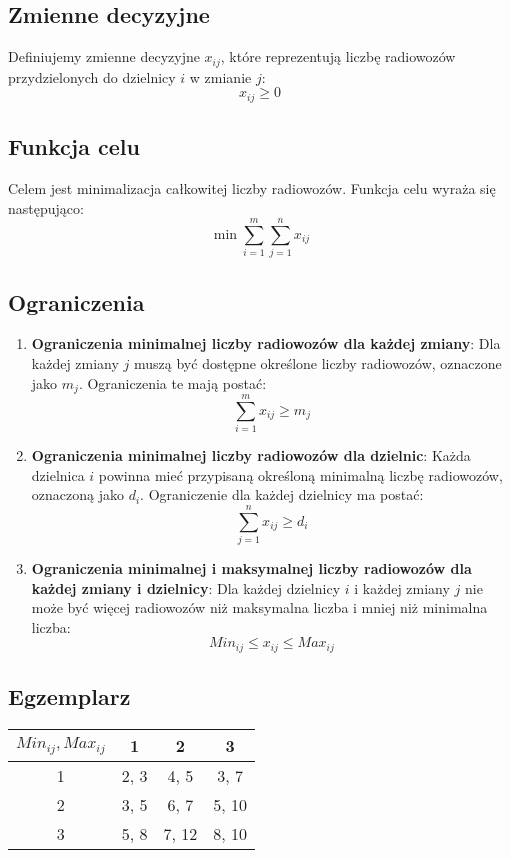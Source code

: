 \documentclass[12pt, letterpaper]{article}
\begin{document}
\subsection{Zmienne decyzyjne}
Definiujemy zmienne decyzyjne \( x_{ij} \), które reprezentują liczbę
radiowozów przydzielonych do dzielnicy \( i \) w zmianie \( j \):
\[
  x_{ij} \geq 0
\]

\subsection{Funkcja celu}
Celem jest minimalizacja całkowitej liczby radiowozów. Funkcja celu wyraża się
następująco:
\[
  \min \sum_{i=1}^{m} \sum_{j=1}^{n} x_{ij}
\]

\subsection{Ograniczenia}
\begin{enumerate}
  \item \textbf{Ograniczenia minimalnej liczby radiowozów dla każdej zmiany}:
        Dla każdej zmiany \( j \) muszą być dostępne określone liczby
        radiowozów, oznaczone jako \( m_j \). Ograniczenia te mają postać:
        \[
          \sum_{i=1}^{m} x_{ij} \geq m_j
        \]

  \item \textbf{Ograniczenia minimalnej liczby radiowozów dla dzielnic}:
        Każda dzielnica \( i \) powinna mieć przypisaną określoną minimalną
        liczbę radiowozów, oznaczoną jako \( d_i \). Ograniczenie dla każdej
        dzielnicy
        ma postać:
        \[
          \sum_{j=1}^{n} x_{ij} \geq d_i
        \]

  \item \textbf{Ograniczenia minimalnej i maksymalnej liczby radiowozów dla
          każdej zmiany i
          dzielnicy}:
        Dla każdej dzielnicy \( i \) i każdej zmiany \( j \) nie może być
        więcej radiowozów niż maksymalna liczba i mniej niż minimalna liczba:
        \[
          Min_{ij} \leq x_{ij} \leq Max_{ij}
        \]
\end{enumerate}

\subsection{Egzemplarz}

\begin{center}
  \begin{tabular}{|c|c|c|c|}
    \hline
    \( Min_{ij}, Max_{ij} \) & 1    & 2     & 3     \\
    \hline
    1                        & 2, 3 & 4, 5  & 3, 7  \\
    2                        & 3, 5 & 6, 7  & 5, 10 \\
    3                        & 5, 8 & 7, 12 & 8, 10 \\
    \hline
  \end{tabular}
\end{center}
\end{document}
